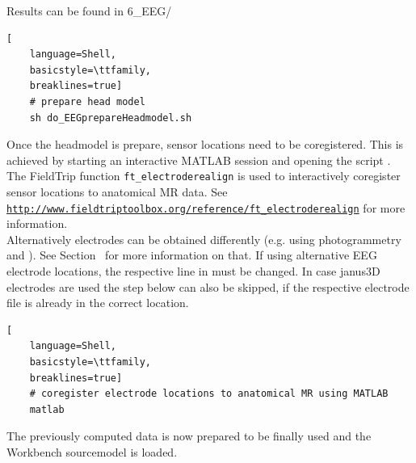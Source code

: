 \documentclass[12pt,a4paper]{scrartcl}
\begin{document}
\noindent Results can be found in 6\_EEG/\\
\begin{lstlisting}[
    language=Shell,
    basicstyle=\ttfamily,
    breaklines=true]
    # prepare head model
    sh do_EEGprepareHeadmodel.sh
\end{lstlisting}
Once the headmodel is prepare, sensor locations need to be coregistered. This is achieved by starting an interactive MATLAB session and opening the script \texttt{}. The FieldTrip function \texttt{ft\_electroderealign} is used to interactively coregister sensor locations to anatomical MR data. See \href{http://www.fieldtriptoolbox.org/reference/ft\_electroderealign}{\nolinkurl{http://www.fieldtriptoolbox.org/reference/ft\_electroderealign}} for more information.\\

\noindent Alternatively electrodes can be obtained differently (e.g. using photogrammetry and \texttt{}). See Section~ for more information on that. If using alternative EEG electrode locations, the respective line in \texttt{} must be changed. In case janus3D electrodes are used the step below can also be skipped, if the respective electrode file is already in the correct location.

\begin{lstlisting}[
    language=Shell,
    basicstyle=\ttfamily,
    breaklines=true]
    # coregister electrode locations to anatomical MR using MATLAB
    matlab
\end{lstlisting}
The previously computed data is now prepared to be finally used and the Workbench sourcemodel is loaded.\\
\end{document}
